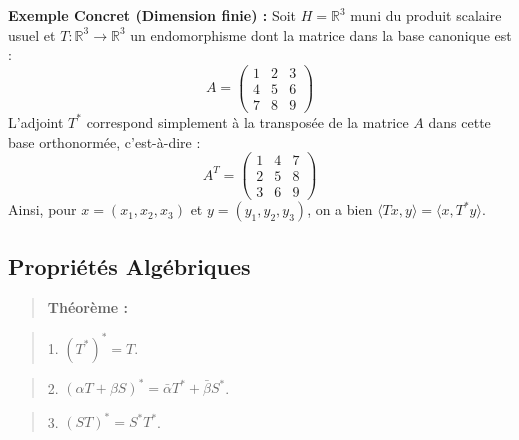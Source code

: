 \documentclass[11pt,a4paper]{article}
\begin{document}
\textbf{Exemple Concret (Dimension finie) :}
Soit $H = \mathbb{R}^3$ muni du produit scalaire usuel et $T : \mathbb{R}^3 \to \mathbb{R}^3$ un endomorphisme dont la matrice dans la base canonique est :
$$A = \begin{pmatrix} 1 & 2 & 3 \\ 4 & 5 & 6 \\ 7 & 8 & 9 \end{pmatrix}$$
L'adjoint $T^*$ correspond simplement à la transposée de la matrice $A$ dans cette base orthonormée, c'est-à-dire :
$$A^T = \begin{pmatrix} 1 & 4 & 7 \\ 2 & 5 & 8 \\ 3 & 6 & 9 \end{pmatrix}$$
Ainsi, pour $x = (x_1, x_2, x_3)$ et $y = (y_1, y_2, y_3)$, on a bien $\langle Tx, y \rangle = \langle x, T^*y \rangle$.


\begin{center}
\end{center}


\subsection{Propriétés Algébriques}

\begin{quote}
\textbf{Théorème :}
\end{quote}
\begin{quote}
1. $(T^*)^* = T$.
\end{quote}
\begin{quote}
2. $(\alpha T + \beta S)^* = \bar{\alpha} T^* + \bar{\beta} S^*$.
\end{quote}
\begin{quote}
3. $(ST)^* = S^* T^*$.
\end{quote}
\end{document}
